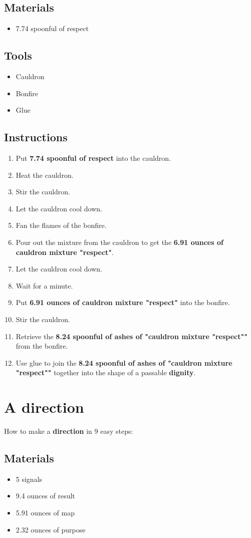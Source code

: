 \documentclass{article}
\begin{document}
\subsection{Materials}\begin{itemize}
\item 
7.74 spoonful of respect
\end{itemize}
\subsection{Tools}\begin{itemize}
\item 
Cauldron
\item 
Bonfire
\item 
Glue
\end{itemize}
\subsection{Instructions}\begin{enumerate}
\item 
Put \textbf{7.74 spoonful of respect} into the cauldron.
\item 
Heat the cauldron.
\item 
Stir the cauldron.
\item 
Let the cauldron cool down.
\item 
Fan the flames of the bonfire.
\item 
Pour out the mixture from the cauldron to get the \textbf{6.91 ounces of cauldron mixture "respect"}.
\item 
Let the cauldron cool down.
\item 
Wait for a minute.
\item 
Put \textbf{6.91 ounces of cauldron mixture "respect"} into the bonfire.
\item 
Stir the cauldron.
\item 
Retrieve the \textbf{8.24 spoonful of ashes of "cauldron mixture "respect""} from the bonfire.
\item 
Use glue to join the \textbf{8.24 spoonful of ashes of "cauldron mixture "respect""} together into the shape of a passable \textbf{dignity}.
\end{enumerate}
\newpage
\section{A direction}How to make a \textbf{direction} in 9 easy steps:

\subsection{Materials}\begin{itemize}
\item 
5 signals
\item 
9.4 ounces of result
\item 
5.91 ounces of map
\item 
2.32 ounces of purpose
\end{itemize}
\end{document}
